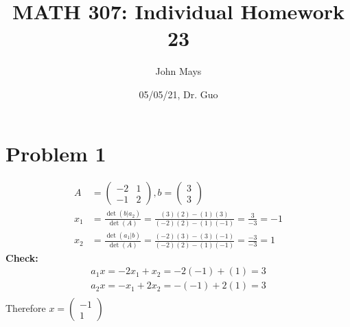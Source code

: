 \documentclass[fleqn]{article}
\title{\textbf{MATH 307: Individual Homework 23}}
\author{John Mays}
\date{05/05/21, Dr. Guo}
\begin{document}
\maketitle

\section*{Problem 1}
\begin{equation*}
    \begin{split}
    A &= \begin{pmatrix}-2 & 1 \\ -1 & 2\end{pmatrix}, b= \begin{pmatrix}3\\3\end{pmatrix}\\
    x_1 &= \frac{\det(b|a_2)}{\det(A)} = \frac{(3)(2)-(1)(3)}{(-2)(2)-(1)(-1)} = \frac{3}{-3} = -1\\
    x_2 &= \frac{\det(a_1|b)}{\det(A)} = \frac{(-2)(3)-(3)(-1)}{(-2)(2)-(1)(-1)} = \frac{-3}{-3} = 1
    \end{split}
\end{equation*}
\textbf{Check: }
\begin{equation*}
    \begin{split}
    a_1x = -2x_1+x_2= -2(-1)+(1) = 3 \\
    a_2x = -x_1 + 2x_2 = -(-1)+2(1) = 3\\
    \end{split}
\end{equation*}
Therefore $x = \begin{pmatrix}-1 \\ 1 \end{pmatrix}$

\pagebreak
\end{document}

